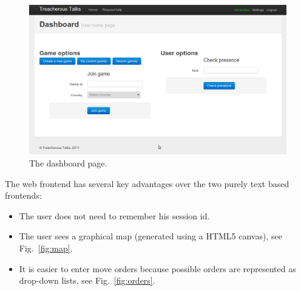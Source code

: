 \documentclass[11pt,a4paper]{report}
\begin{document}
\begin{figure}[h]
 \centering
 \includegraphics[width=\textwidth]{./graphics/overviewpage.png}
 \caption{The dashboard page.}
 \label{fig:dashboard}
\end{figure}

The web frontend has several key advantages over the two purely text based
frontends:
\begin{itemize}
\item The user does not need to remember his session id.
\item The user sees a graphical map (generated using a HTML5 canvas),
  see Fig.~\ref{fig:map}.
\item It is easier to enter move orders because possible orders are represented
  as drop-down lists, see Fig.~\ref{fig:orders}.
\end{itemize}
\end{document}

